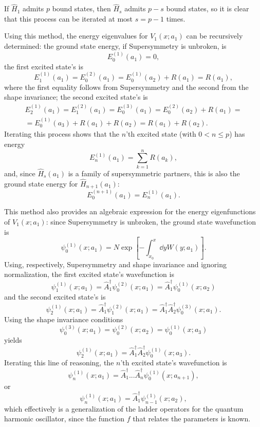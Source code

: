 If $\hat H_1$ admits $p$ bound states, then $\hat H_s$ admits $p-s$ bound states, so it is clear
that this process can be iterated at most $s=p-1$ times.

 Using this method, the energy eigenvalues for $V_1(x;a_1)$ can be recursively
determined: the ground state energy, if Supersymmetry is unbroken, is
$$E_0^{(1)}(a_1)=0,$$
the first excited state's is
$$E_1^{(1)}(a_1) = E_0^{(2)}(a_1) = E_0^{(1)}(a_2)+R(a_1)=R(a_1),$$
where the first equality follows from Supersymmetry and the second from the shape invariance;
the second excited state's is
\begin{gather*}
E_2^{(1)}(a_1)=E_1^{(2)}(a_1)=E_0^{(3)}(a_1)=E_0^{(2)}(a_2)+R(a_1)=\\
= E_0^{(1)}(a_3)+R(a_1)+R(a_2)=R(a_1)+R(a_2).
\end{gather*}
Iterating this process shows that the $n$'th excited state (with $0<n\leq p$) has energy
\begin{equation}
E_n^{(1)}(a_1) = \sum_{k=1}^{n}R(a_k),
\label{eq:SIP_spectrum}
\end{equation}
and, since $\hat H_s(a_1)$ is a family of supersymmetric partners, this is also the ground state
energy for $\hat H_{n+1}(a_1)$:
$$E_{0}^{(n+1)}(a_1) = E^{(1)}_n(a_1).$$

This method also provides an algebraic expression for the energy eigenfunctions of $V_1(x;a_1)$:
since Supersymmetry is unbroken, the ground state wavefunction is
$$\psi^{(1)}_0(x;a_1)=N\exp\left[-\int_{x_0}^{x}\dd yW(y;a_1)\right].$$
Using, respectively, Supersymmetry and shape invariance and ignoring
normalization, the first excited state's wavefunction
is
$$\psi^{(1)}_1(x;a_1) =\hat A^\dagger_1\psi^{(2)}_0(x;a_1)=
\hat A^\dagger_1\psi^{(1)}_0(x;a_2)$$
and the second excited state's is
$$\psi_2^{(1)}(x;a_1)=\hat A^\dagger_1\psi_1^{(2)}(x;a_1)
= \hat A^\dagger_1 \hat A^\dagger_2\psi_0^{(3)}(x;a_1).$$
Using the shape invariance conditions
$$\psi_0^{(3)}(x;a_1)=\psi_0^{(2)}(x;a_2)=\psi_0^{(1)}(x;a_3)$$
yields
$$\psi^{(1)}_2(x;a_1)= \hat A^\dagger_1\hat A^\dagger_2\psi_0^{(1)}(x;a_3).$$
Iterating this line of reasoning, the $n$'th excited state's wavefunction is
\begin{equation}
\psi^{(1)}_n(x;a_1)=\hat A^\dagger_1...\hat A^\dagger_{n}\psi^{(1)}_0(x;a_{n+1}),
\label{eq:SIP_wave}
\end{equation}
or
\begin{equation}
    \psi^{(1)}_n(x;a_1)=\hat A_1^\dagger\psi^{(1)}_{n-1}(x;a_2),
    \label{eq:SIP_wave_rec}
\end{equation}
which effectively is a generalization of the ladder operators for the quantum harmonic
oscillator, since the function $f$ that relates the parameters is known.
